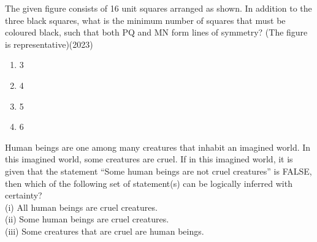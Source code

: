     The given figure consists of 16 unit squares arranged as shown. In addition to the
    three black squares, what is the minimum number of squares that must be coloured
    black, such that both PQ and MN form lines of symmetry? (The figure is
    representative)\hfill (2023)
    \begin{figure}[!ht]
        \centering
        \caption{}
    \end{figure}
    \begin{enumerate}[label = (\Alph*)]
        \item 3
        \item 4
        \item 5
        \item 6
    \end{enumerate}
    \item[6.]  Human beings are one among many creatures that inhabit an imagined world. In
    this imagined world, some creatures are cruel. If in this imagined world, it is given
    that the statement “Some human beings are not cruel creatures” is FALSE, then
    which of the following set of statement(s) can be logically inferred with certainty?\\
    (i) All human beings are cruel creatures.\\
    (ii) Some human beings are cruel creatures.\\
    (iii) Some creatures that are cruel are human beings.\\
